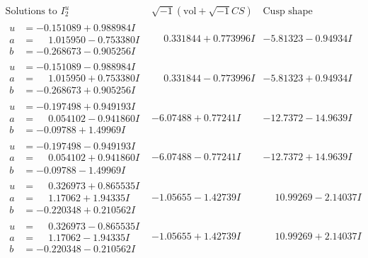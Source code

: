 \documentclass[1p]{elsarticle_modified}
\theoremstyle{definition}
\newcommand{\I}{\sqrt{-1}}
\begin{document}
$$\begin{array}{c|c|c}  
\text{Solutions to }I^u_{2}& \I (\text{vol} + \sqrt{-1}CS) & \text{Cusp shape}\\
 \hline 
\begin{aligned}
u &= -0.151089 + 0.988984 I \\
a &= \phantom{-}1.015950 - 0.753380 I \\
b &= -0.268673 - 0.905256 I\end{aligned}
 & \phantom{-}0.331844 + 0.773996 I & -5.81323 - 0.94934 I \\ \hline\begin{aligned}
u &= -0.151089 - 0.988984 I \\
a &= \phantom{-}1.015950 + 0.753380 I \\
b &= -0.268673 + 0.905256 I\end{aligned}
 & \phantom{-}0.331844 - 0.773996 I & -5.81323 + 0.94934 I \\ \hline\begin{aligned}
u &= -0.197498 + 0.949193 I \\
a &= \phantom{-}0.054102 - 0.941860 I \\
b &= -0.09788 + 1.49969 I\end{aligned}
 & -6.07488 + 0.77241 I & -12.7372 - 14.9639 I \\ \hline\begin{aligned}
u &= -0.197498 - 0.949193 I \\
a &= \phantom{-}0.054102 + 0.941860 I \\
b &= -0.09788 - 1.49969 I\end{aligned}
 & -6.07488 - 0.77241 I & -12.7372 + 14.9639 I \\ \hline\begin{aligned}
u &= \phantom{-}0.326973 + 0.865535 I \\
a &= \phantom{-}1.17062 + 1.94335 I \\
b &= -0.220348 + 0.210562 I\end{aligned}
 & -1.05655 - 1.42739 I & \phantom{-}10.99269 - 2.14037 I \\ \hline\begin{aligned}
u &= \phantom{-}0.326973 - 0.865535 I \\
a &= \phantom{-}1.17062 - 1.94335 I \\
b &= -0.220348 - 0.210562 I\end{aligned}
 & -1.05655 + 1.42739 I & \phantom{-}10.99269 + 2.14037 I \\ \hline\begin{aligned}

\end{aligned}
\end{array}$$
\end{document}
